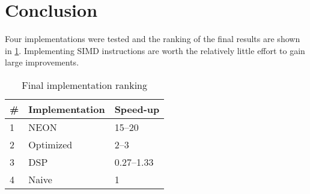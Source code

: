 \documentclass[final]{article}
\begin{document}
\section{Conclusion}
Four implementations were tested and the ranking of the final results are shown in \cref{tab:final-implementation-ranking}. 
Implementing SIMD instructions are worth the relatively little effort to gain large improvements.

\begin{table}[H]
\centering
\caption{Final implementation ranking}
\label{tab:final-implementation-ranking}
\begin{tabular}{lll}
\toprule
\textbf{\#} & \textbf{Implementation} & \textbf{Speed-up}\\
\midrule
1 & NEON        &  \numrange{15}{20}\\
2 & Optimized   &  \numrange{2}{3}\\ %
3 & DSP         &  \numrange{0.27}{1.33}\\ %
4 & Naive       &  1\\
\bottomrule
\end{tabular}
\end{table}
\end{document}
